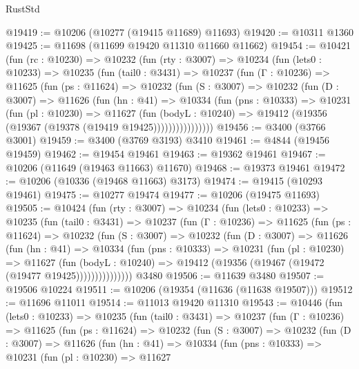 \begin{lexlean}{RustStd}
\begin{coremodule}
@19419 := @10206 (@10277 (@19415 @11689) @11693)
@19420 := @10311 @1360
@19425 := @11698 (@11699 @19420 @11310 @11660 @11662)
@19454 := @10421
    (fun (rc : @10230) =>
    @10232
      (fun (rty : @3007) =>
      @10234
        (fun (lets0 : @10233) =>
        @10235
          (fun (tail0 : @3431) =>
          @10237
            (fun (Γ : @10236) =>
            @11625
              (fun (ps : @11624) =>
              @10232
                (fun (S : @3007) =>
                @10232
                  (fun (D : @3007) =>
                  @11626
                    (fun (hn : @41) =>
                    @10334
                      (fun (pns : @10333) =>
                      @10231
                        (fun (pl : @10230) =>
                        @11627
                          (fun (bodyL : @10240) =>
                          @19412 (@19356 (@19367 (@19378 (@19419 @19425))))))))))))))))
@19456 := @3400 (@3766 @3001)
@19459 := @3400 (@3769 @3193) @3410
@19461 := @4844 (@19456 @19459)
@19462 := @19454 @19461
@19463 := @19362 @19461
@19467 := @10206 (@11649 (@19463 @11663) @11670)
@19468 := @19373 @19461
@19472 := @10206 (@10336 (@19468 @11663) @3173)
@19474 := @19415 (@10293 @19461)
@19475 := @10277 @19474
@19477 := @10206 (@19475 @11693)
@19505 := @10424
    (fun (rty : @3007) =>
    @10234
      (fun (lets0 : @10233) =>
      @10235
        (fun (tail0 : @3431) =>
        @10237
          (fun (Γ : @10236) =>
          @11625
            (fun (ps : @11624) =>
            @10232
              (fun (S : @3007) =>
              @10232
                (fun (D : @3007) =>
                @11626
                  (fun (hn : @41) =>
                  @10334
                    (fun (pns : @10333) =>
                    @10231
                      (fun (pl : @10230) =>
                      @11627
                        (fun (bodyL : @10240) =>
                        @19412 (@19356 (@19467 (@19472 (@19477 @19425)))))))))))))))
    @3480
@19506 := @11639 @3480
@19507 := @19506 @10224
@19511 := @10206 (@19354 (@11636 (@11638 @19507)))
@19512 := @11696 @11011
@19514 := @11013 @19420 @11310
@19543 := @10446
    (fun (lets0 : @10233) =>
    @10235
      (fun (tail0 : @3431) =>
      @10237
        (fun (Γ : @10236) =>
        @11625
          (fun (ps : @11624) =>
          @10232
            (fun (S : @3007) =>
            @10232
              (fun (D : @3007) =>
              @11626
                (fun (hn : @41) =>
                @10334
                  (fun (pns : @10333) =>
                  @10231
                    (fun (pl : @10230) =>
                    @11627

\end{coremodule}
\end{lexlean}
